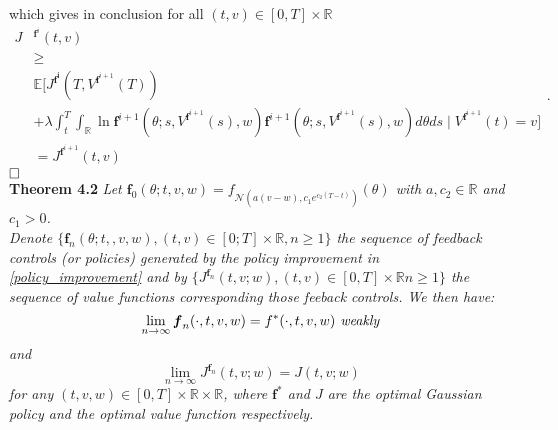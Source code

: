 \documentclass[oneside, a4paper, onecolumn, 11pt]{article}
\begin{document}
which gives in conclusion for all $(t,v) \in [0,T]\times\mathbb{R}$
\begin{equation} 
\begin{aligned} 
    J&^{\boldsymbol{f}^i}(t,v)\\ &\geq \\
    &\mathbb{E}\Bigg[  J^{\boldsymbol{f^i}}\left(T, V^{\boldsymbol{f}^{i+1}}(T)\right) \\&+ \lambda \int_{t}^{T}\int_{\mathbb{R}}\ln{\boldsymbol{f}^{i+1}(\theta;s,V^{\boldsymbol{f}^{i+1}}(s),w)}\boldsymbol{f}^{i+1}(\theta;s,V^{\boldsymbol{f}^{i+1}}(s),w)d\theta ds \mid V^{\boldsymbol{f}^{i+1}}(t)=v\Bigg]\\
    &= J^{\boldsymbol{f}^{i+1}}(t,v)
\end{aligned}.
\end{equation} $\hfill \square$ 
\\\textbf{Theorem 4.2} \cite{WangZhou2020} \textit{ Let $\boldsymbol{f}_0(\theta; t, v,w) = f_{\mathcal{N}\left(a(v-w), c_1 e^{c_2(T-t)}\right)}(\theta)$  with $a,c_2\in \mathbb{R}$ and $c_1 > 0$. \\Denote $\{\boldsymbol{f}_n(\theta; t,,v,w), (t,v) \in [0;T] \times \mathbb{R}, n\geq 1\}$ the sequence of feedback controls (or policies) generated by the policy improvement in \eqref{policy_improvement}  and by  $\{J^{\boldsymbol{f}_n}(t,v;w), (t,v) \in [0,T] \times \mathbb{R} n \geq 1\}$ the sequence  of value functions corresponding those feeback controls. We then have: }
\begin{equation}
\lim_{n\to\infty} \boldsymbol{f}_n(\cdot,t,v,w) = f^*(\cdot,t,v,w) \textit{ weakly}\\ 
\end{equation}
\textit{and }
\begin{equation}
  \lim_{n\to\infty} J^{\boldsymbol{f}_n}(t,v;w) = J(t,v;w)
\end{equation}
\textit{for any $(t,v,w)\in [0,T] \times \mathbb{R} \times \mathbb{R}$, where $\boldsymbol{f}^*$ and $J$ are the optimal Gaussian policy and the optimal value function respectively.}
\end{document}
